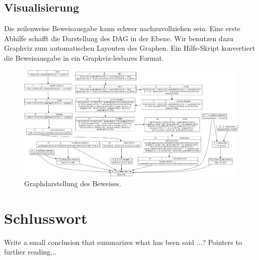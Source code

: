 \documentclass{article}
\begin{document}
\subsection{Visualisierung}
\label{subsec:outputvis}

Die zeilenweise Beweisausgabe kann schwer nachzuvollziehen sein. Eine erste Abhilfe schafft
die Darstellung des DAG in der Ebene. Wir benutzen dazu Graphviz zum automatischen Layouten
des Graphen. Ein Hilfs-Skript konvertiert die Beweisausgabe in ein Graphviz-lesbares Format.

\begin{figure}[H]
	\centering
	\includegraphics[scale=0.25]{./graphics/pytriple.pdf}
	\caption{Graphdarstellung des Beweises.}
	\label{fig:pytriple}
\end{figure}


\section{Schlusswort}
\label{sec:conclusion}
Write a small conclusion that summarizes what has been said ...?
Pointers to further reading...





\end{document}
